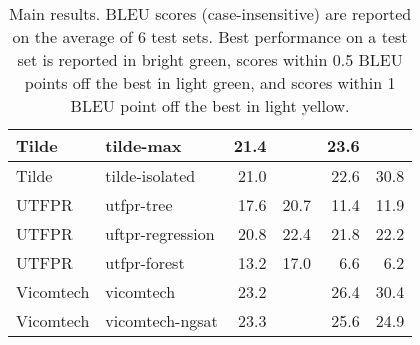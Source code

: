 \begin{table*}
\begin{center}
\begin{tabular}{|l|l|r|r|r|r|}
Tilde & tilde-max & 21.4 & \cellcolor{lightgreen}{26.2} & 23.6 & \cellcolor{lightyellow}{31.2} \\ \hline
Tilde & tilde-isolated & 21.0 & \cellcolor{lightyellow}{25.9} & 22.6 & 30.8 \\ \hline
UTFPR & utfpr-tree & 17.6 & 20.7 & 11.4 & 11.9 \\ \hline
UTFPR & uftpr-regression & 20.8 & 22.4 & 21.8 & 22.2 \\ \hline
UTFPR & utfpr-forest & 13.2 & 17.0 & 6.6 & 6.2 \\ \hline
Vicomtech & vicomtech & 23.2 & \cellcolor{lightyellow}{25.9} & 26.4 & 30.4 \\ \hline
Vicomtech & vicomtech-ngsat & 23.3 & \cellcolor{lightyellow}{25.8} & 25.6 & 24.9 \\ \hline
\end{tabular}
\end{center}
\caption{Main results. BLEU scores (case-insensitive) are reported on the average of 6 test sets. Best performance on a test set is reported in bright green, scores within 0.5 BLEU points off the best in light green, and scores within 1 BLEU point off the best in light yellow.}
\label{tab:results}
\end{table*}
